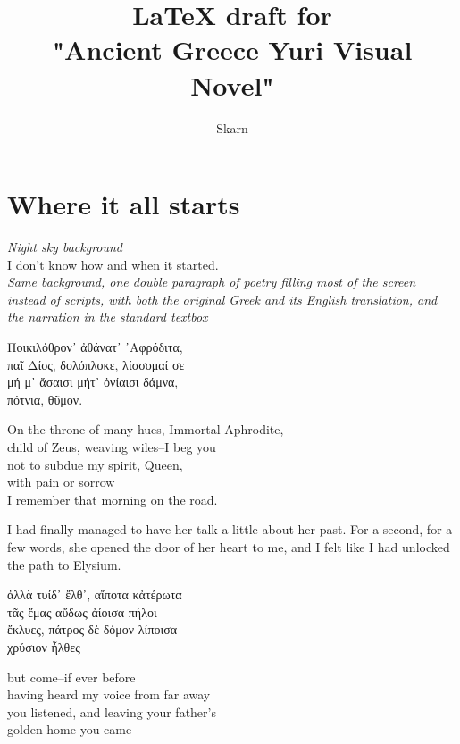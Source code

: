 \documentclass{report}
\title{LaTeX draft for \\"Ancient Greece Yuri Visual Novel"}
\author{Skarn}
\newcommand{\dcomment}[1]{
	\emph{#1}
	\\
}
\begin{document}

\maketitle

\chapter*{Where it all starts}

\dcomment{
	Night sky background
}

I don't know how and when it started.\\

\dcomment{
	Same background, one double paragraph of poetry filling most of the screen instead of scripts, with both the original Greek and its English translation, and the narration in the standard textbox
}

\begin{otherlanguage}{greek}
Ποικιλόθρον᾽ ἀθάνατ᾽ ᾽Αφρόδιτα,\\
παῖ Δίος, δολόπλοκε, λίσσομαί σε\\
μή μ᾽ ἄσαισι μήτ᾽ ὀνίαισι δάμνα,\\
πότνια, θῦμον.
\end{otherlanguage}

On the throne of many hues, Immortal Aphrodite,\\
child of Zeus, weaving wiles--I beg you\\
not to subdue my spirit, Queen,\\
with pain or sorrow
\\

I remember that morning on the road.

I had finally managed to have her talk a little about her past. For a second, for a few words, she opened the door of her heart to me, and I felt like I had unlocked the path to Elysium.\\

\begin{otherlanguage}{greek}
ἀλλὰ τυίδ᾽ ἔλθ᾽, αἴποτα κἀτέρωτα\\
τᾶς ἔμας αὔδως ἀίοισα πήλοι\\
ἔκλυες, πάτρος δὲ δόμον λίποισα\\
χρύσιον ἦλθες
\end{otherlanguage}

but come--if ever before\\
having heard my voice from far away\\
you listened, and leaving your father's\\
golden home you came
\\
\end{document}
